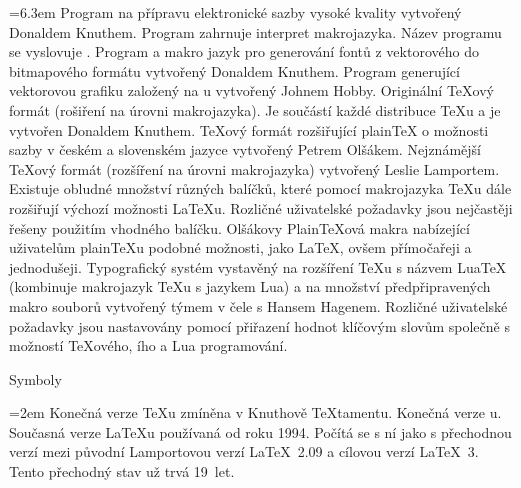 \medskip
\bgroup \leftskip=6.3em
\abbrv[\TeX{}]  Program na přípravu elektronické sazby vysoké kvality
   vytvořený Donaldem Knuthem. Program zahrnuje interpret makrojazyka.
   Název programu se vyslovuje .
\abbrv[\METAFONT{}] Program a makro jazyk pro generování fontů
   z vektorového do bitmapového formátu vytvořený Donaldem Knuthem.
\abbrv[\METAPOST{}] Program generující vektorovou grafiku založený na
   \METAFONT{}u vytvořený Johnem Hobby.
  Originální \TeX{}ový formát (rošiření na úrovni 
   makrojazyka). Je součástí každé distribuce \TeX{}u a je
   vytvořen Donaldem Knuthem.
\abbrv[\csplain{}] \TeX{}ový formát rozšiřující plain\TeX{} o možnosti sazby
   v českém a slovenském jazyce vytvořený Petrem Olšákem.
\abbrv[\LaTeX{}]  Nejznámější \TeX{}ový formát (rozšíření na úrovni 
   makrojazyka) vytvořený Leslie Lamportem. 
   Existuje obludné množství různých balíčků, které pomocí
   makrojazyka \TeX{}u dále rozšiřují výchozí možnosti \LaTeX{}u.
   Rozličné uživatelské požadavky jsou nejčastěji řešeny použitím vhodného balíčku.
\abbrv[OPmac] Olšákovy Plain\TeX{}ová makra nabízející uživatelům
   plain\TeX{}u podobné možnosti, jako \LaTeX{}, ovšem přímočařeji
   a jednodušeji.
  Typografický systém vystavěný na rozšíření \TeX{}u s
   názvem Lua\TeX{} (kombinuje makrojazyk \TeX{}u s jazykem Lua) a na množství
   předpřipravených makro souborů vytvořený týmem v čele s Hansem Hagenem.
   Rozličné uživatelské požadavky jsou nastavovány pomocí přiřazení hodnot
   klíčovým slovům společně s možností \TeX{}ového, \METAPOST{}ího a 
   Lua programování.
\par\egroup


\sec Symboly

\medskip
\bgroup \leftskip=2em
\abbrv[$\pi$] Konečná verze \TeX{}u zmíněna v Knuthově \TeX{}tamentu.
\abbrv[e] Konečná verze \METAFONT{}u.
\abbrv[$2\varepsilon$] Současná verze \LaTeX{}u používaná od roku 1994.
Počítá se s ní jako s přechodnou verzí mezi původní Lamportovou 
verzí \LaTeX{}~2.09 a cílovou verzí \LaTeX{}~3. Tento přechodný stav už trvá
19~let.
\par\egroup


